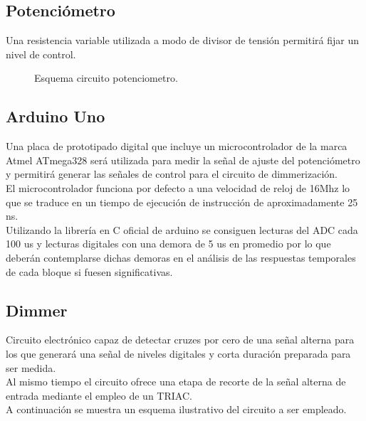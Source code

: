 \documentclass[a4paper,11pt]{article}
\begin{document}
\subsection{Potenciómetro}
Una resistencia variable utilizada a modo de divisor de tensión permitirá fijar un nivel de control.
\begin{figure}[H] %
	\caption{Esquema circuito potenciometro.}
	\label{fig:potenciometro}
\end{figure} 

\subsection{Arduino Uno}
Una placa de prototipado digital que incluye un microcontrolador de la marca Atmel ATmega328 será utilizada para medir la señal de ajuste del potenciómetro y permitirá generar las señales de control para el circuito de dimmerización.\\
El microcontrolador funciona por defecto a una velocidad de reloj de 16Mhz lo que se traduce en un tiempo de ejecución de instrucción de aproximadamente 25 ns.\\
Utilizando la librería en C oficial de arduino se consiguen lecturas del ADC cada 100 us y lecturas digitales con una demora de 5 us en promedio por lo que deberán contemplarse dichas demoras en el análisis de las respuestas temporales de cada bloque si fuesen significativas.

\subsection{Dimmer}
Circuito electrónico capaz de detectar cruzes por cero de una señal alterna para los que generará una señal de niveles digitales y corta duración preparada para ser medida.\\
Al mismo tiempo el circuito ofrece una etapa de recorte de la señal alterna de entrada mediante el empleo de un TRIAC.\\
A continuación se muestra un esquema ilustrativo del circuito a ser empleado.
\end{document}
